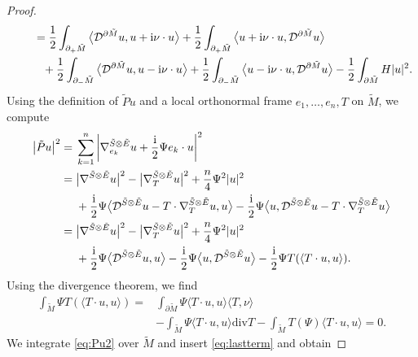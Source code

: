 \documentclass[11pt]{article}
\numberwithin{equation}{section}
\numberwithin{equation}{section}
\begin{document}
\begin{proof}
\begin{align}
&\qquad= \frac{1}{2} \int_{\partial_+ \tilde{M}} \big\langle \mathcal{D}^{\partial \tilde{M}} u,u + {\rm i} \nu \cdot u \big\rangle + \frac{1}{2} \int_{\partial_+ \tilde{M}} \big\langle u + {\rm i} \nu \cdot u,\mathcal{D}^{\partial \tilde{M}} u \big\rangle\nonumber \\
&\qquad\phantom{=}{} + \frac{1}{2} \int_{\partial_- \tilde{M}} \big\langle \mathcal{D}^{\partial \tilde{M}} u,u - {\rm i} \nu \cdot u \big\rangle + \frac{1}{2} \int_{\partial_- \tilde{M}} \big\langle u - {\rm i} \nu \cdot u,\mathcal{D}^{\partial \tilde{M}} u \big\rangle
 - \frac{1}{2} \int_{\partial \tilde{M}} H |u|^2.\label{eq:formula1}
\end{align}
Using the definition of $\tilde{P} u$ and a local orthonormal frame $e_1,\dots,e_n,T$ on $\tilde{M}$, we compute
\begin{align}
\big|\tilde{P} u\big|^2
={}&
\sum_{k=1}^n \left| \nabla_{e_k}^{\tilde{S} \otimes \tilde{E}} u + \frac{\rm i}{2} \Psi e_k \cdot u \right|^2 \nonumber\\
={}&
\big|\nabla^{\tilde{S} \otimes \tilde{E}} u\big|^2 - \big|\nabla_T^{\tilde{S} \otimes \tilde{E}} u\big|^2 + \frac{n}{4} \Psi^2 |u|^2 \nonumber\\
& + \frac{\rm i}{2} \Psi \big\langle \mathcal{D}^{\tilde{S} \otimes \tilde{E}} u - T \cdot \nabla_T^{\tilde{S} \otimes \tilde{E}} u,u \big\rangle - \frac{\rm i}{2} \Psi \big\langle u,\mathcal{D}^{\tilde{S} \otimes \tilde{E}} u - T \cdot \nabla_T^{\tilde{S} \otimes \tilde{E}} u \big\rangle \nonumber\\
={}&
\big|\nabla^{\tilde{S} \otimes \tilde{E}} u\big|^2 - \big|\nabla_T^{\tilde{S} \otimes \tilde{E}} u\big|^2 + \frac{n}{4} \Psi^2 |u|^2 \nonumber\\
& + \frac{\rm i}{2} \Psi \big\langle \mathcal{D}^{\tilde{S} \otimes \tilde{E}} u,u \big\rangle - \frac{\rm i}{2} \Psi \big\langle u,\mathcal{D}^{\tilde{S} \otimes \tilde{E}} u \big\rangle - \frac{\rm i}{2} \Psi T(\langle T \cdot u,u \rangle).\label{eq:Pu2}
\end{align}
Using the divergence theorem, we find
\begin{align}
\int_{\tilde{M}} \Psi T(\langle T \cdot u,u \rangle)
={}& \int_{\partial \tilde{M}} \Psi \langle T \cdot u,u \rangle \langle T,\nu \rangle \nonumber\\
& - \int_{\tilde{M}} \Psi \langle T \cdot u,u \rangle \mathrm{div} T - \int_{\tilde{M}} T(\Psi) \langle T \cdot u,u \rangle = 0 .\label{eq:lastterm}
\end{align}
We integrate \eqref{eq:Pu2} over $\tilde{M}$ and insert \eqref{eq:lastterm} and obtain

\end{proof}
\end{document}
